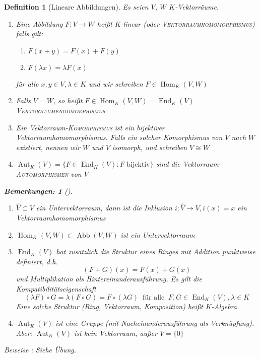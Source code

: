 \documentclass{report}
\newcommand{\IN}[1]{\index{#1|BH}}
\newcommand{\lb}{\lambda}
\DeclareMathOperator{\abb}{Abb}
\DeclareMathOperator{\Hom}{Hom}
\DeclareMathOperator{\End}{End}
\DeclareMathOperator{\Aut}{Aut}
\theoremstyle{customrem}
\newtheorem*{bemerkung2}{Bemerkungen\textnormal:}
\newenvironment{bemerkungen}[1][]{\begin{bemerkung2}[#1]\leavevmode}{\end{bemerkung2}}
\theoremstyle{customdef}
\newtheorem{definition}{Definition}[chapter]
\newcommand{\defemph}[1]{\textsc{#1}}
\begin{document}
	\begin{definition}[Lineare Abbildungen]
		\label{def31}
		\IN{Lineare Abbildung}
		Es seien $V$, $W$ $K$-Vektorräume.
		\begin{enumerate}
			\item Eine Abbildung $F : V \to W$ heißt $K$-linear (oder \defemph{Vektorraumhomomorphismus}) falls gilt:
			\begin{enumerate}[leftmargin=5cm]
				\item $F(x + y) = F(x) + F(y)$
				\item $F(\lb x) = \lb F(x)$
			\end{enumerate}
			für alle $x, y \in V, \lb \in K$ und wir schreiben $F \in \Hom_K(V, W)$
			
			\item Falls $V = W$, so heißt $F \in \Hom_K(V, W) = \End_K(V)$ \defemph{Vektorraumendomorphismus}
			\item Ein Vektorraum-\defemph{Komorphismus} ist ein bijektiver Vektorraumhomomorphismus. Falls ein solcher Komorphismus von $V$ nach $W$ existiert, nennen wir $W$ und $V$ isomorph, und schreiben $V \cong W$
			\item $\Aut_K(V) = \{F \in \End_K(V) : F \text{ bijektiv}\}$ sind die Vektorraum-\defemph{Automorphismen} von $V$
		\end{enumerate}
		\vspace{.1cm}
		\begin{bemerkungen}
			\begin{enumerate}
				\item $\hat{V} \subset V$ ein Untervektorraum, dann ist die Inklusion $i : \hat{V} \to V, i(x) = x$ ein Vektorraumhomomorphismus
				\item $\Hom_K(V, W) \subset \abb(V, W)$ ist ein Untervektorraum
				\item $\End_K(V)$ hat zusätzlich die Struktur eines Ringes mit Addition punktweise definiert, d.h. $$(F + G)(x) = F(x) + G(x)$$ und Multiplikation als Hintereinanderausführung.
				Es gilt die Kompatibilitätseigenschaft
				$$(\lb F) \circ G = \lb (F \circ G) = F \circ (\lb G)\ \text{ für alle }\ F, G \in \End_K(V), \lb \in K$$
				Eine solche Struktur (Ring, Vektorraum, Komposition) heißt $K$-Algebra.
				
				\item $\Aut_K(V)$ ist eine Gruppe (mit Nacheinanderausführung als Verknüpfung). Aber: $\Aut_K(V)$ ist kein Vektorraum, außer $V = \{0\}$
			\end{enumerate}
		\end{bemerkungen}
		Beweise : Siehe Übung.\\
		

\end{definition}
\end{document}
